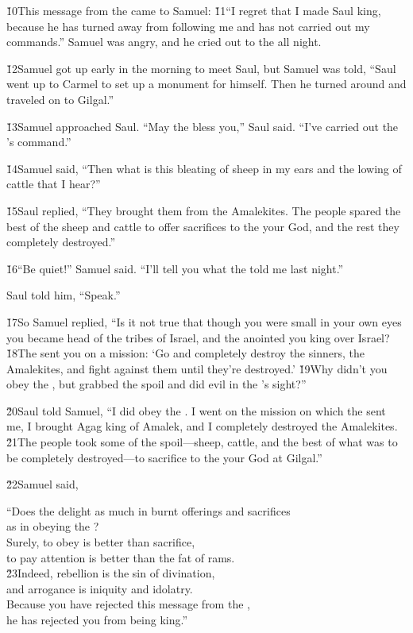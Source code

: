\v{10}This message from the  came to Samuel: \v{11}``I regret that I made Saul king, because he has turned away from following me and has not carried out my commands.'' Samuel was angry, and he cried out to the  all night.

\v{12}Samuel got up early in the morning to meet Saul, but Samuel was told, ``Saul went up to Carmel to set up a monument for himself. Then he turned around and traveled on to Gilgal.''

\v{13}Samuel approached Saul. ``May the  bless you,'' Saul said. ``I've carried out the 's command.''

\v{14}Samuel said, ``Then what is this bleating of sheep in my ears and the lowing of cattle that I hear?''

\v{15}Saul replied, ``They brought them from the Amalekites. The people spared the best of the sheep and cattle to offer sacrifices to the  your God, and the rest they completely destroyed.''

\v{16}``Be quiet!'' Samuel said. ``I'll tell you what the  told me last night.''

Saul told him, ``Speak.''

\v{17}So Samuel replied, ``Is it not true that though you were small in your own eyes you became head of the tribes of Israel, and the  anointed you king over Israel? \v{18}The  sent you on a mission: `Go and completely destroy the sinners, the Amalekites, and fight against them until they're destroyed.' \v{19}Why didn't you obey the , but grabbed the spoil and did evil in the 's sight?''

\v{20}Saul told Samuel, ``I did obey the . I went on the mission on which the  sent me, I brought Agag king of Amalek, and I completely destroyed the Amalekites. \v{21}The people took some of the spoil---sheep, cattle, and the best of what was to be completely destroyed---to sacrifice to the  your God at Gilgal.''

\v{22}Samuel said,

\begin{poetry}
\poeml ``Does the  delight as much in burnt offerings and sacrifices \\
\poemll    as in obeying the ? \\
\poeml Surely, to obey is better than sacrifice, \\
\poemll    to pay attention is better than the fat of rams. \\
\poeml \v{23}Indeed, rebellion is the sin of divination, \\
\poemll    and arrogance is iniquity and idolatry. \\
\poeml Because you have rejected this message from the , \\
\poemll    he has rejected you from being king.''
\end{poetry}

